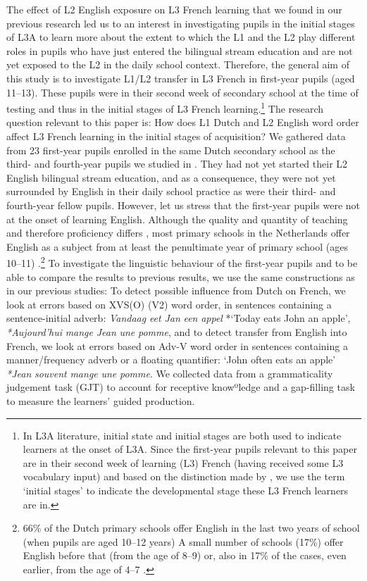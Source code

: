 \documentclass[output=paper,modfonts,nonflat, newtxmath]{langsci/langscibook}
\begin{document}
  The effect of L2 English exposure on L3 French learning that we found in our previous research led us to an interest in investigating pupils in the initial stages of L3A to learn more about the extent to which the L1 and the L2 play different roles in pupils who have just entered the bilingual stream education and are not yet exposed to the L2 in the daily school context. Therefore, the general aim of this study is to investigate L1/L2 transfer in L3 French in first-year pupils (aged 11–13). These pupils were in their second week of secondary school at the time of testing and thus in the initial stages of L3 French learning.\footnote{ \textrm{In L3A literature, initial state and initial stages are both used to indicate learners at the onset of L3A. Since the first-year pupils relevant to this paper are in their second week of learning (L3) French (having received some L3 vocabulary input) and based on the distinction made by \citet{GarciaMayoRothman2012}, we use the term ‘initial stages’ to indicate the developmental stage these L3 French learners are in.}} The research question relevant to this paper is: How does L1 Dutch and L2 English word order affect L3 French learning in the initial stages of acquisition? We gathered data from 23 first-year pupils enrolled in the same Dutch secondary school as the third- and fourth-year pupils we studied in \citet{StadtEtAl2016, StadtEtAl2018Exposure}. They had not yet started their L2 English bilingual stream education, and as a consequence, they were not yet surrounded by English in their daily school practice as were their third- and fourth-year fellow pupils. However, let us stress that the first-year pupils were not at the onset of learning English. Although the quality and quantity of teaching and therefore proficiency differs \citep{UnsworthEtAl2015}, most primary schools in the Netherlands offer English as a subject from at least the penultimate year of primary school (ages 10–11) \citep{Rose2016}.\footnote{66\% of the Dutch primary schools offer English in the last two years of school (when pupils are aged 10–12 years) A small number of schools (17\%) offer English before that (from the age of 8–9) or, also in 17\% of the cases, even earlier, from the age of 4–7 \citep{ThijsEtAl2011}.} To investigate the linguistic behaviour of the first-year pupils and to be able to compare the results to previous results, we use the same constructions as in our previous studies: To detect possible influence from Dutch on French, we look at errors based on XVS(O) (V2) word order, in sentences containing a sentence-initial adverb: \textit{Vandaag} {\textit{eet}} \textit{Jan} \textit{een} \textit{appel} *‘Today {eats} John an apple’, \textit{*Aujourd’hui} {\textit{mange}} \textit{Jean} \textit{une} \textit{pomme}, and to detect transfer from English into French, we look at errors based on Adv-V word order in sentences containing a manner/frequency adverb or a floating quantifier: ‘John often {eats} an apple’ \textit{*Jean} \textit{souvent} {\textit{mange}} \textit{une} \textit{pomme}. We collected data from a grammaticality judgement task (GJT) to account for receptive knowºledge and a gap-filling task to measure the learners’ guided production.
\end{document}
